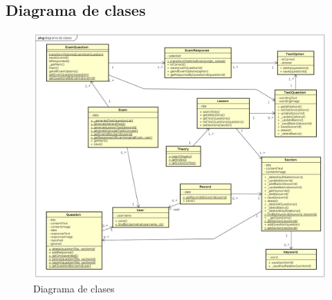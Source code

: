 \documentclass[openright,twoside,10pt]{book}
\begin{document}
    \vspace*{\fill} \newpage
    
    \subsection{Diagrama de clases}\label{diagrama-de-clases}
    
    \vspace*{\fill}
    
    \begin{figure}[H]
        \begin{center}
            \includegraphics[width=\textwidth, angle=-90]{img/astah/disenio/clases/clasesNavegable.png}
        \end{center}
        \caption{Diagrama de clases}
    \end{figure}
    
    \vspace*{\fill} \newpage
    
    \vspace*{\fill}
    
\end{document}
